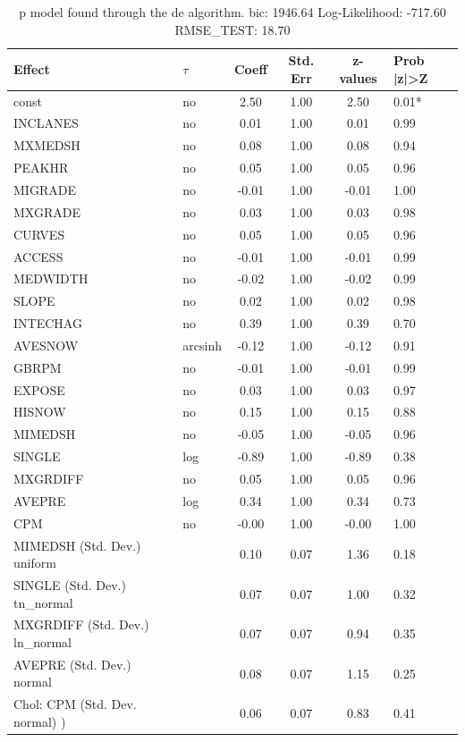 \begin{table}
	\caption{p model found through the de algorithm. bic: 1946.64 Log-Likelihood: -717.60 RMSE_TEST: 18.70}
	\begin{center}
		\begin{tabular}{|l|l|c|c|c|l|}
			\hline
			Effect & $\tau$ & Coeff & Std. Err & z-values & Prob |z|>Z \\
			\hline
			const & no & 2.50 & 1.00 & 2.50 & 0.01* \\
			\hline
			INCLANES & no & 0.01 & 1.00 & 0.01 & 0.99 \\
			\hline
			MXMEDSH & no & 0.08 & 1.00 & 0.08 & 0.94 \\
			\hline
			PEAKHR & no & 0.05 & 1.00 & 0.05 & 0.96 \\
			\hline
			MIGRADE & no & -0.01 & 1.00 & -0.01 & 1.00 \\
			\hline
			MXGRADE & no & 0.03 & 1.00 & 0.03 & 0.98 \\
			\hline
			CURVES & no & 0.05 & 1.00 & 0.05 & 0.96 \\
			\hline
			ACCESS & no & -0.01 & 1.00 & -0.01 & 0.99 \\
			\hline
			MEDWIDTH & no & -0.02 & 1.00 & -0.02 & 0.99 \\
			\hline
			SLOPE & no & 0.02 & 1.00 & 0.02 & 0.98 \\
			\hline
			INTECHAG & no & 0.39 & 1.00 & 0.39 & 0.70 \\
			\hline
			AVESNOW & arcsinh & -0.12 & 1.00 & -0.12 & 0.91 \\
			\hline
			GBRPM & no & -0.01 & 1.00 & -0.01 & 0.99 \\
			\hline
			EXPOSE & no & 0.03 & 1.00 & 0.03 & 0.97 \\
			\hline
			HISNOW & no & 0.15 & 1.00 & 0.15 & 0.88 \\
			\hline
			MIMEDSH & no & -0.05 & 1.00 & -0.05 & 0.96 \\
			\hline
			SINGLE & log & -0.89 & 1.00 & -0.89 & 0.38 \\
			\hline
			MXGRDIFF & no & 0.05 & 1.00 & 0.05 & 0.96 \\
			\hline
			AVEPRE & log & 0.34 & 1.00 & 0.34 & 0.73 \\
			\hline
			CPM & no & -0.00 & 1.00 & -0.00 & 1.00 \\
			\hline
			MIMEDSH (Std. Dev.) uniform &  & 0.10 & 0.07 & 1.36 & 0.18 \\
			\hline
			SINGLE (Std. Dev.) tn_normal &  & 0.07 & 0.07 & 1.00 & 0.32 \\
			\hline
			MXGRDIFF (Std. Dev.) ln_normal &  & 0.07 & 0.07 & 0.94 & 0.35 \\
			\hline
			AVEPRE (Std. Dev.) normal &  & 0.08 & 0.07 & 1.15 & 0.25 \\
			\hline
			 Chol: CPM (Std. Dev. normal) ) &  & 0.06 & 0.07 & 0.83 & 0.41 \\
			\hline
		\end{tabular}
	\end{center}
\end{table}